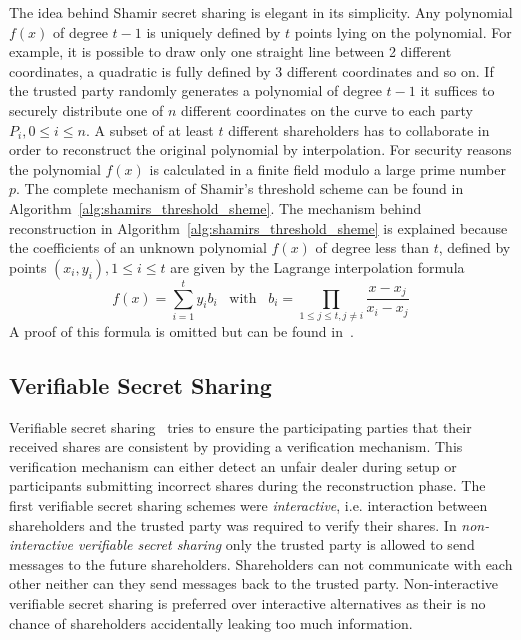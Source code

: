 The idea behind Shamir secret sharing is elegant in its simplicity. Any polynomial $f \left( x \right)$ of degree $t-1$ is uniquely defined by $t$ points lying on the polynomial. For example, it is possible to draw only one straight line between 2 different coordinates, a quadratic is fully defined by 3 different coordinates and so on. If the trusted party randomly generates a polynomial of degree $t-1$ it suffices to securely distribute one of $n$ different coordinates on the curve to each party $P_i, 0 \leq i \leq n$. A subset of at least $t$ different shareholders has to collaborate in order to reconstruct the original polynomial by interpolation. For security reasons the polynomial $f \left( x \right)$ is calculated in a finite field modulo a large prime number $p$. The complete mechanism of Shamir's threshold scheme can be found in Algorithm~\ref{alg:shamirs_threshold_sheme}. The mechanism behind reconstruction in Algorithm~\ref{alg:shamirs_threshold_sheme} is explained because the coefficients of an unknown polynomial $f \left( x \right)$ of degree less than $t$, defined by points $\left( x_i, y_i \right), 1 \leq i \leq t$ are given by the Lagrange interpolation formula
\begin{equation*}
 f \left( x \right) = \sum^t_{i=1}y_i b_i \; \; \; \textrm{with} \; \; \; b_i = \prod_{1 \leq j \leq t, j \neq i} \frac{x-x_j}{x_i-x_j}
\end{equation*}
A proof of this formula is omitted but can be found in~\cite{site:proofwiki_lagrange}.

\subsection{Verifiable Secret Sharing}
Verifiable secret sharing~\cite{art:ChorGMA85} tries to ensure the participating parties that their received shares are consistent by providing a verification mechanism. This verification mechanism can either detect an unfair dealer during setup or participants submitting incorrect shares during the reconstruction phase. The first verifiable secret sharing schemes were \textit{interactive}, i.e. interaction between shareholders and the trusted party was required to verify their shares. In \textit{non-interactive verifiable secret sharing} only the trusted party is allowed to send messages to the future shareholders. Shareholders can not communicate with each other neither can they send messages back to the trusted party. Non-interactive verifiable secret sharing is preferred over interactive alternatives as their is no chance of shareholders accidentally leaking too much information.

